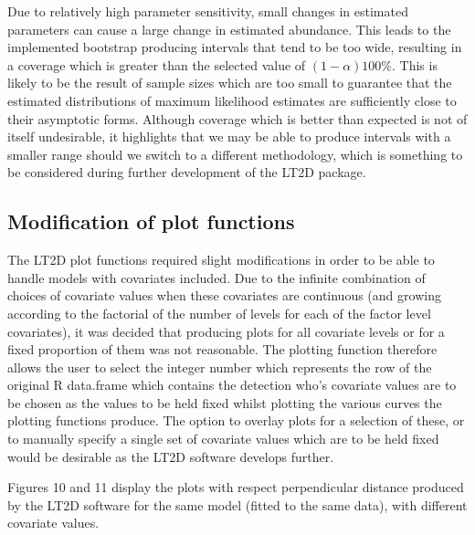 \documentclass[11pt]{article}
\begin{document}
\begin{multicols}{2}
Due to relatively high parameter sensitivity, small changes in estimated parameters can cause a large change in estimated abundance. This leads to the implemented bootstrap producing intervals that tend to be too wide, resulting in a coverage which is greater than the selected value of $(1-\alpha) 100\%$. This is likely to be the result of sample sizes which are too small to guarantee that the estimated distributions of maximum likelihood estimates are sufficiently close to their asymptotic forms. Although coverage which is better than expected is not of itself undesirable, it highlights that we may be able to produce intervals with a smaller range should we switch to a different methodology, which is something to be considered during further development of the LT2D package. 


\subsection{Modification of plot functions}
The LT2D plot functions required slight modifications in order to be able to handle models with covariates included. Due to the infinite combination of choices of covariate values when these covariates are continuous (and growing according to the factorial of the number of levels for each of the factor level covariates), it was decided that producing plots for all covariate levels or for a fixed proportion of them was not reasonable. The plotting function therefore allows the user to select the integer number which represents the row of the original R data.frame which contains the detection who's covariate values are to be chosen as the values to be held fixed whilst plotting the various curves the plotting functions produce.  The option to overlay plots for a selection of these, or to manually specify a single set of covariate values which are to be held fixed would be desirable as the LT2D software develops further.

Figures 10 and 11 display the plots with respect perpendicular distance produced by the LT2D software for the same model (fitted to the same data), with different covariate values. 



\end{multicols}
\end{document}
